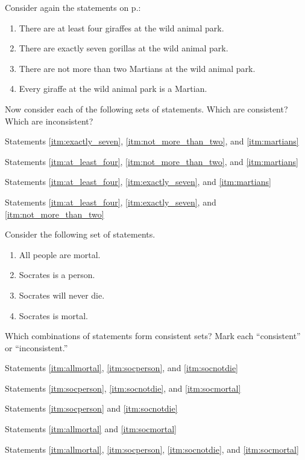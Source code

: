 \noindent \problempart Consider again the statements on p.\pageref{MartianGiraffes}: 
\begin{enumerate}[label=(\alph*)]
\item \label{itm:at_least_four}There are at least four giraffes at the wild animal park.
\item \label{itm:exactly_seven} There are exactly seven gorillas at the wild animal park.
\item \label{itm:not_more_than_two} There are not more than two Martians at the wild animal park.
\item \label{itm:martians} Every giraffe at the wild animal park is a Martian.
\end{enumerate}
Now consider each of the following sets of statements. Which are consistent? Which are inconsistent?
\begin{exercises}
\item Statements \ref{itm:exactly_seven}, \ref{itm:not_more_than_two}, and \ref{itm:martians} 
\item Statements \ref{itm:at_least_four}, \ref{itm:not_more_than_two}, and \ref{itm:martians} 
\item Statements \ref{itm:at_least_four}, \ref{itm:exactly_seven}, and \ref{itm:martians}
\item Statements \ref{itm:at_least_four}, \ref{itm:exactly_seven}, and \ref{itm:not_more_than_two} 
\end{exercises}

\noindent \problempart Consider the following set of statements.
\begin{enumerate}[label=(\alph*)]
\item \label{itm:allmortal} All people are mortal.
\item \label{itm:socperson} Socrates is a person.
\item \label{itm:socnotdie} Socrates will never die.
\item \label{itm:socmortal} Socrates is mortal.
\end{enumerate}
Which combinations of statements form consistent sets? Mark each “consistent” or “inconsistent.”
\begin{exercises}
\item Statements \ref{itm:allmortal}, \ref{itm:socperson}, and \ref{itm:socnotdie}  
\item Statements \ref{itm:socperson}, \ref{itm:socnotdie}, and \ref{itm:socmortal} 
\item Statements \ref{itm:socperson} and \ref{itm:socnotdie} 
\item Statements \ref{itm:allmortal} and \ref{itm:socmortal} 
\item Statements \ref{itm:allmortal}, \ref{itm:socperson}, \ref{itm:socnotdie}, and \ref{itm:socmortal}  
\end{exercises}

